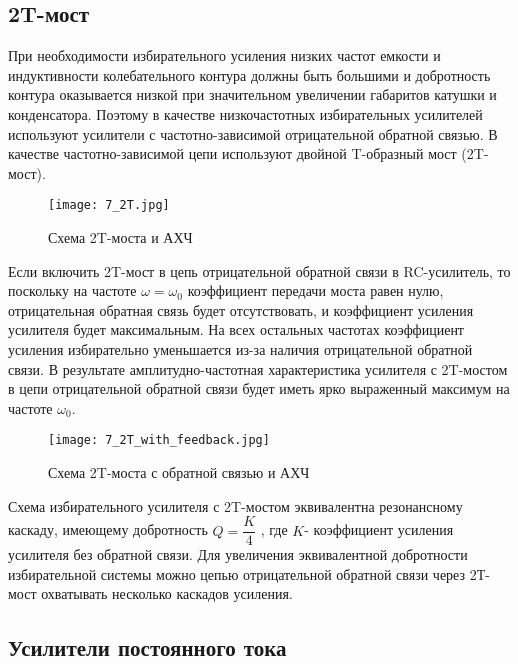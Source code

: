 \subsection*{2T-мост}

При необходимости избирательного усиления низких частот емкости и индуктивности колебательного контура должны быть большими и добротность контура оказывается низкой при значительном увеличении габаритов катушки и конденсатора. Поэтому в качестве низкочастотных избирательных усилителей используют усилители с частотно-зависимой отрицательной обратной связью. В качестве частотно-зависимой цепи используют двойной T-образный мост (2T-мост).

\begin{figure}[H]
\centering
\texttt{[image: 7\_2T.jpg]}
\caption{Схема 2T-моста и АХЧ}
\label{fig:7_2T}
\end{figure}

Если включить 2T-мост в цепь отрицательной обратной связи в RC-усилитель, то поскольку на частоте $\omega = \omega_{0}$ коэффициент передачи моста равен нулю, отрицательная обратная связь будет отсутствовать, и коэффициент усиления усилителя будет максимальным. На всех остальных частотах коэффициент усиления избирательно уменьшается из-за наличия отрицательной обратной связи. В результате амплитудно-частотная характеристика усилителя с 2T-мостом в цепи отрицательной обратной связи будет иметь ярко выраженный максимум на частоте $\omega_{0}$.

\begin{figure}[H]
\centering
\texttt{[image: 7\_2T\_with\_feedback.jpg]}
\caption{Схема 2T-моста с обратной связью и АХЧ}
\label{fig:7_2T_with_feedback}
\end{figure}

Схема избирательного усилителя с 2T-мостом эквивалентна резонансному каскаду, имеющему добротность $Q = \dfrac{K}{4}$ , где $K$- коэффициент усиления усилителя без обратной связи. Для увеличения эквивалентной добротности избирательной системы можно цепью отрицательной обратной связи через 2Т-мост охватывать несколько каскадов усиления.

\subsection*{Усилители постоянного тока}

